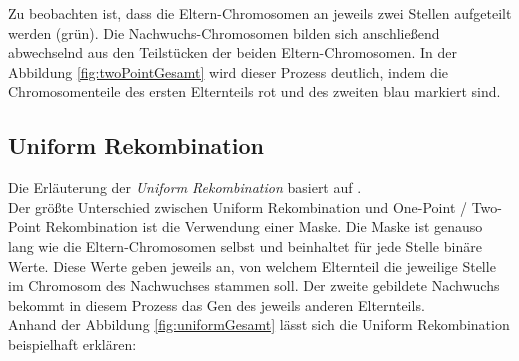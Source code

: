 Zu beobachten ist, dass die Eltern-Chromosomen an jeweils zwei Stellen aufgeteilt werden (grün).
Die Nachwuchs-Chromosomen bilden sich anschließend abwechselnd aus den Teilstücken der beiden Eltern-Chromosomen.
In der Abbildung \ref{fig:twoPointGesamt} wird dieser Prozess deutlich, indem die Chromosomenteile des ersten Elternteils rot und des zweiten blau markiert sind.


\subsection{Uniform Rekombination}
\label{subsubsec:unformCrossover}
Die Erläuterung der \emph{Uniform Rekombination} basiert auf \cite{syswerda_uniform_1989}.\\
Der größte Unterschied zwischen Uniform Rekombination und One-Point / Two-Point Rekombination ist die Verwendung einer Maske. 
Die Maske ist genauso lang wie die Eltern-Chromosomen selbst und beinhaltet für jede Stelle binäre Werte.
Diese Werte geben jeweils an, von welchem Elternteil die jeweilige Stelle im Chromosom des Nachwuchses stammen soll.
Der zweite gebildete Nachwuchs bekommt in diesem Prozess das Gen des jeweils anderen Elternteils.\\
Anhand der Abbildung \ref{fig:uniformGesamt} lässt sich die Uniform Rekombination beispielhaft erklären:

